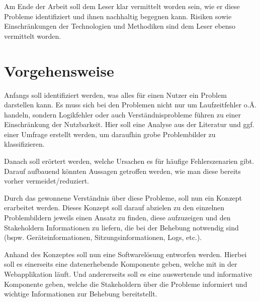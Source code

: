 Am Ende der Arbeit soll dem Leser klar vermittelt worden sein, wie er diese Probleme identifiziert und ihnen nachhaltig begegnen kann. Risiken sowie Einschränkungen der Technologien und Methodiken sind dem Leser ebenso vermittelt worden.

%

\section{Vorgehensweise}

Anfangs soll identifiziert werden, was alles für einen Nutzer ein Problem darstellen kann. Es muss sich bei den Problemen nicht nur um Laufzeitfehler o.Ä. handeln, sondern Logikfehler oder auch Verständnisprobleme führen zu einer Einschränkung der Nutzbarkeit. Hier soll eine Analyse aus der Literatur und ggf. einer Umfrage erstellt werden, um daraufhin grobe Problembilder zu klassifizieren.

Danach soll erörtert werden, welche Ursachen es für häufige Fehlerszenarien gibt. Darauf aufbauend könnten Aussagen getroffen werden, wie man diese bereits vorher vermeidet/reduziert.

Durch das gewonnene Verständnis über diese Probleme, soll nun ein Konzept erarbeitet werden. Dieses Konzept soll darauf abzielen zu den einzelnen Problembildern jeweils einen Ansatz zu finden, diese aufzuzeigen und den Stakeholdern Informationen zu liefern, die bei der Behebung notwendig sind (bspw. Geräteinformationen, Sitzungsinformationen, Logs, etc.).

Anhand des Konzeptes soll nun eine Softwarelösung entworfen werden. Hierbei soll es einerseits eine datenerhebende Komponente geben, welche mit in der Webapplikation läuft. Und andererseits soll es eine auswertende und informative Komponente geben, welche die Stakeholdern über die Probleme informiert und wichtige Informationen zur Behebung bereitstellt.

